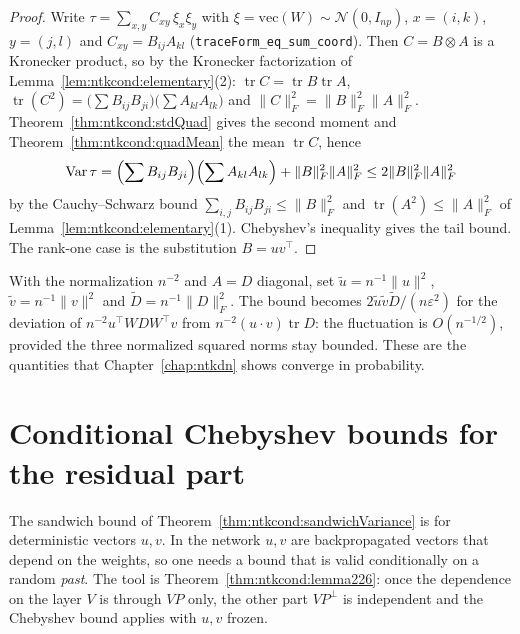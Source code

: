 \begin{proof}
  \leanok
Write $\tau=\sum_{x,y}C_{xy}\,\xi_x\xi_y$ with $\xi=\mathrm{vec}(W)\sim\mathcal N(0,I_{np})$, $x=(i,k)$, $y=(j,l)$ and $C_{xy}=B_{ij}A_{kl}$ (\texttt{traceForm\_eq\_sum\_coord}). Then $C=B\otimes A$ is a Kronecker product, so by the Kronecker factorization of Lemma~\ref{lem:ntkcond:elementary}(2):
$\operatorname{tr}C=\operatorname{tr}B\operatorname{tr}A$, $\operatorname{tr}(C^2)=\bigl(\sum B_{ij}B_{ji}\bigr)\bigl(\sum A_{kl}A_{lk}\bigr)$ and $\|C\|_F^2=\|B\|_F^2\|A\|_F^2$. Theorem~\ref{thm:ntkcond:stdQuad} gives the second moment and Theorem~\ref{thm:ntkcond:quadMean} the mean $\operatorname{tr}C$, hence
\[
  \operatorname{Var}\tau=\Bigl(\sum B_{ij}B_{ji}\Bigr)\Bigl(\sum A_{kl}A_{lk}\Bigr)+\|B\|_F^2\|A\|_F^2\le2\|B\|_F^2\|A\|_F^2
\]
by the Cauchy--Schwarz bound $\sum_{i,j}B_{ij}B_{ji}\le\|B\|_F^2$ and $\operatorname{tr}(A^2)\le\|A\|_F^2$ of Lemma~\ref{lem:ntkcond:elementary}(1). Chebyshev's inequality gives the tail bound. The rank-one case is the substitution $B=uv^\top$.
\end{proof}

\begin{remark}[Scaling]\label{rmk:ntkcond:sandwichScaling}
With the normalization $n^{-2}$ and $A=D$ diagonal, set $\tilde u=n^{-1}\|u\|^2$, $\tilde v=n^{-1}\|v\|^2$ and $\tilde D=n^{-1}\|D\|_F^2$. The bound becomes $2\tilde u\tilde v\tilde D/(n\varepsilon^2)$ for the deviation of $n^{-2}u^\top WDW^\top v$ from $n^{-2}(u\cdot v)\operatorname{tr}D$: the fluctuation is $O(n^{-1/2})$, provided the three normalized squared norms stay bounded. These are the quantities that Chapter~\ref{chap:ntkdn} shows converge in probability.
\end{remark}


\section{Conditional Chebyshev bounds for the residual part}\label{sec:ntkcond:conditional}

The sandwich bound of Theorem~\ref{thm:ntkcond:sandwichVariance} is for deterministic vectors $u,v$. In the network $u,v$ are backpropagated vectors that depend on the weights, so one needs a bound that is valid conditionally on a random \emph{past}. The tool is Theorem~\ref{thm:ntkcond:lemma226}: once the dependence on the layer $V$ is through $VP$ only, the other part $VP^\perp$ is independent and the Chebyshev bound applies with $u,v$ frozen.

